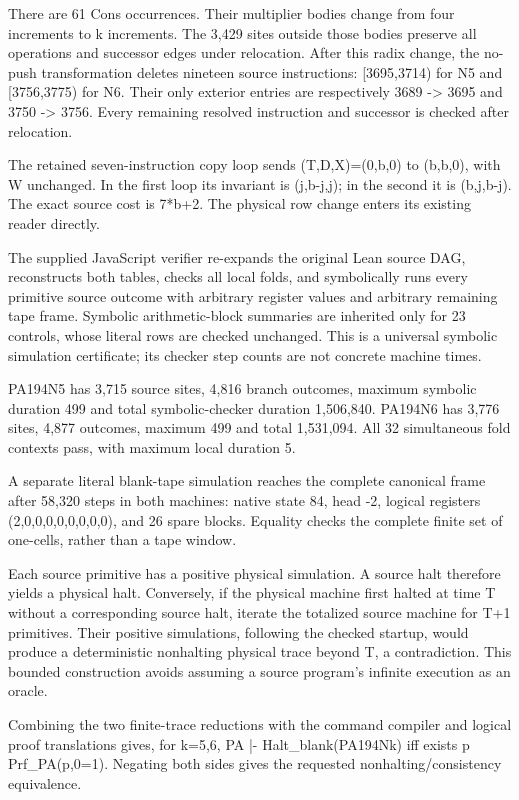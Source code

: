 \documentclass[11pt,letterpaper]{article}
\begin{document}
There are 61 Cons occurrences. Their multiplier bodies change from four increments to k increments. The 3,429 sites outside those bodies preserve all operations and successor edges under relocation. After this radix change, the no-push transformation deletes nineteen source instructions: [3695,3714) for N5 and [3756,3775) for N6. Their only exterior entries are respectively 3689 -> 3695 and 3750 -> 3756. Every remaining resolved instruction and successor is checked after relocation.

The retained seven-instruction copy loop sends (T,D,X)=(0,b,0) to (b,b,0), with W unchanged. In the first loop its invariant is (j,b-j,j); in the second it is (b,j,b-j). The exact source cost is 7*b+2. The physical row change enters its existing reader directly.

The supplied JavaScript verifier re-expands the original Lean source DAG, reconstructs both tables, checks all local folds, and symbolically runs every primitive source outcome with arbitrary register values and arbitrary remaining tape frame. Symbolic arithmetic-block summaries are inherited only for 23 controls, whose literal rows are checked unchanged. This is a universal symbolic simulation certificate; its checker step counts are not concrete machine times.

PA194N5 has 3,715 source sites, 4,816 branch outcomes, maximum symbolic duration 499 and total symbolic-checker duration 1,506,840. PA194N6 has 3,776 sites, 4,877 outcomes, maximum 499 and total 1,531,094. All 32 simultaneous fold contexts pass, with maximum local duration 5.

A separate literal blank-tape simulation reaches the complete canonical frame after 58,320 steps in both machines: native state 84, head -2, logical registers (2,0,0,0,0,0,0,0,0), and 26 spare blocks. Equality checks the complete finite set of one-cells, rather than a tape window.

Each source primitive has a positive physical simulation. A source halt therefore yields a physical halt. Conversely, if the physical machine first halted at time T without a corresponding source halt, iterate the totalized source machine for T+1 primitives. Their positive simulations, following the checked startup, would produce a deterministic nonhalting physical trace beyond T, a contradiction. This bounded construction avoids assuming a source program's infinite execution as an oracle.

Combining the two finite-trace reductions with the command compiler and logical proof translations gives, for k=5,6, PA |- Halt\_blank(PA194Nk) iff exists p Prf\_PA(p,0=1). Negating both sides gives the requested nonhalting/consistency equivalence.
\end{document}
